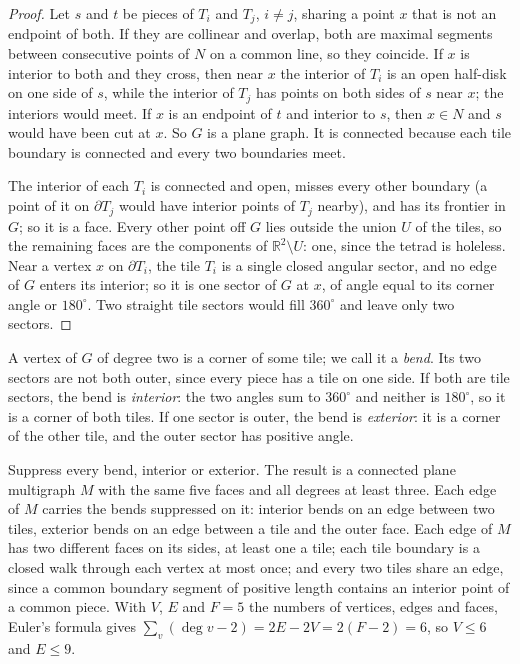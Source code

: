 \documentclass[11pt]{article}
\theoremstyle{definition}
\theoremstyle{remark}
\newcommand{\R}{\mathbb R}
\begin{document}
\begin{proof}
Let $s$ and $t$ be pieces of $T_i$ and $T_j$, $i\ne j$, sharing a point $x$
that is not an endpoint of both. If they are collinear and overlap, both are
maximal segments between consecutive points of $N$ on a common line, so
they coincide. If $x$ is interior to both and they cross, then near $x$ the
interior of $T_i$ is an open half-disk on one side of $s$, while the interior
of $T_j$ has points on both sides of $s$ near $x$; the interiors would meet.
If $x$ is an endpoint of $t$ and interior to $s$, then $x\in N$ and $s$ would
have been cut at $x$. So $G$ is a plane graph. It is connected because each
tile boundary is connected and every two boundaries meet.

The interior of each $T_i$ is connected and open, misses every other
boundary (a point of it on $\partial T_j$ would have interior points of
$T_j$ nearby), and has its frontier in $G$; so it is a face. Every other
point off $G$ lies outside the union $U$ of the tiles, so the remaining faces
are the components of $\R^2\setminus U$: one, since the tetrad is
holeless. Near a vertex $x$ on $\partial T_i$, the tile $T_i$ is a single
closed angular sector, and no edge of $G$ enters its interior; so it is one
sector of $G$ at $x$, of angle equal to its corner angle or $180^\circ$. Two
straight tile sectors would fill $360^\circ$ and leave only two sectors.
\end{proof}

A vertex of $G$ of degree two is a corner of some tile; we call it a
\emph{bend}. Its two sectors are not both outer, since every piece has a
tile on one side. If both are tile sectors, the bend is \emph{interior}:
the two angles sum to $360^\circ$ and neither is $180^\circ$, so it is a
corner of both tiles. If one sector is outer, the bend is
\emph{exterior}: it is a corner of the other tile, and the outer sector
has positive angle.

Suppress every bend, interior or exterior. The result is a connected plane
multigraph $M$ with the same five faces and all degrees at least three.
Each edge of $M$ carries the bends suppressed on it: interior bends on an
edge between two tiles, exterior bends on an edge between a tile and the
outer face.
Each edge of $M$ has two different faces on its sides, at least one a tile;
each tile boundary is a closed walk through each vertex at most once; and
every two tiles share an edge, since a common boundary segment of positive
length contains an interior point of a common piece. With $V$, $E$ and
$F=5$ the numbers of vertices, edges and faces, Euler's formula gives
$\sum_v(\deg v-2)=2E-2V=2(F-2)=6$, so $V\le 6$ and $E\le 9$.
\end{document}
